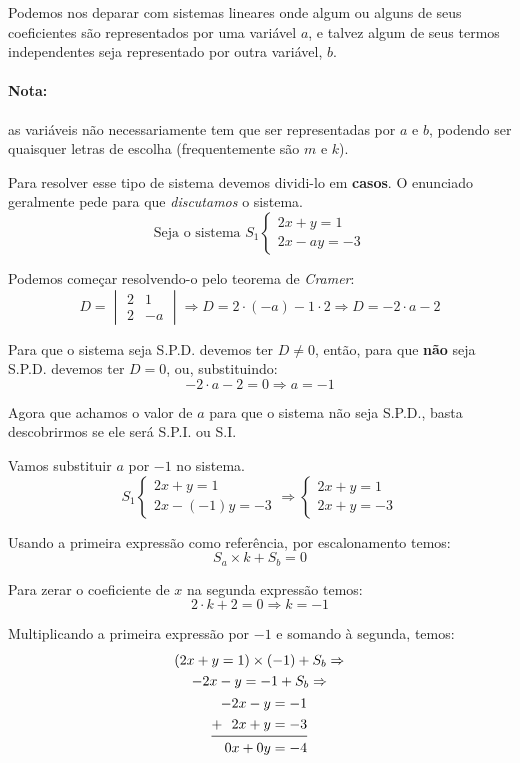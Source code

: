Podemos nos deparar com sistemas lineares onde algum ou alguns de seus coeficientes são representados por uma variável $a$, e talvez algum de seus termos independentes seja representado por outra variável, $b$.

\paragraph{Nota:}
as variáveis não necessariamente tem que ser representadas por $a$ e $b$, podendo ser quaisquer letras de escolha (frequentemente são $m$ e $k$).

\medskip

Para resolver esse tipo de sistema devemos dividi-lo em \textbf{casos}. O enunciado geralmente pede para que \textit{discutamos} o sistema.
$$\text{Seja o sistema }S_1\begin{cases}
2x+y=1\\
2x-ay=-3
\end{cases}$$

Podemos começar resolvendo-o pelo teorema de \textit{Cramer}:
$$
D=\begin{vmatrix}
2 & 1\\
2 & -a
\end{vmatrix}\Rightarrow D=2\cdot (-a) -1\cdot 2\Rightarrow D=-2\cdot a-2
$$

Para que o sistema seja S.P.D. devemos ter $D\neq 0$, então, para que \textbf{não} seja S.P.D. devemos ter $D=0$, ou, substituindo:
$$
-2\cdot a-2=0\Rightarrow a=-1
$$

Agora que achamos o valor de $a$ para que o sistema não seja S.P.D., basta descobrirmos se ele será S.P.I. ou S.I.

Vamos substituir $a$ por $-1$ no sistema.
$$
S_1\begin{cases}
2x+y=1\\
2x-(-1)y=-3
\end{cases}\Rightarrow\begin{cases}
2x+y=1\\
2x+y=-3
\end{cases}
$$

Usando a primeira expressão como referência, por escalonamento temos:
$$S_a\times k+S_b=0$$

Para zerar o coeficiente de $x$ na segunda expressão temos:
$$2\cdot k+2=0\Rightarrow k=-1$$

Multiplicando a primeira expressão por $-1$ e somando à segunda, temos:
\begin{gather*}
    (2x+y=1) \times (-1)+S_b \Rightarrow\\ -2x-y=-1 + S_b\Rightarrow\\
    \begin{aligned}
    -2x-y&=-1\\
    \mathbf{+}~~2x+y&=-3\\\midrule
    0x+0y&=-4
    \end{aligned}
\end{gather*}

